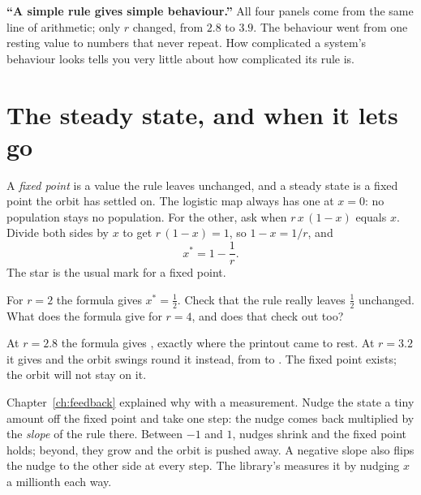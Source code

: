 \begin{trapbox}
\textbf{\enquote{A simple rule gives simple behaviour.}} All four panels
come from the same line of arithmetic; only $r$ changed, from $\num{2.8}$
to $\num{3.9}$. The behaviour went from one resting value to numbers that
never repeat. How complicated a system's behaviour looks tells you very
little about how complicated its rule is.
\end{trapbox}

\section{The steady state, and when it lets go}
\label{sec:ch05-fixed}

\noindent
A \emph{fixed point} is a value the rule leaves unchanged, and a steady state
is a fixed point the orbit has settled on. The logistic map always has one at
$x = 0$: no population stays no population. For the other, ask when
$r\,x\,(1 - x)$ equals $x$. Divide both sides by $x$ to get
$r\,(1 - x) = 1$, so $1 - x = 1/r$, and
\[ x^{*} = 1 - \frac{1}{r}. \]
The star is the usual mark for a fixed point.

\begin{think}
For $r = 2$ the formula gives $x^{*} = \tfrac12$. Check that the rule really
leaves $\tfrac12$ unchanged. What does the formula give for $r = 4$, and
does that check out too?
\end{think}

\noindent
At $r = \num{2.8}$ the formula gives , exactly where the
printout came to rest. At $r = \num{3.2}$ it gives 
\dash{} and the orbit swings round it instead, from  to
. The fixed point exists; the orbit will not stay on it.

Chapter~\ref{ch:feedback} explained why with a measurement. Nudge the state
a tiny amount off the fixed point and take one step: the nudge comes back
multiplied by the \emph{slope} of the rule there. Between $-1$ and $1$,
nudges shrink and the fixed point holds; beyond, they grow and the orbit is
pushed away. A negative slope also flips the nudge to the other side at
every step. The library's  measures it by nudging $x$ a millionth
each way.


